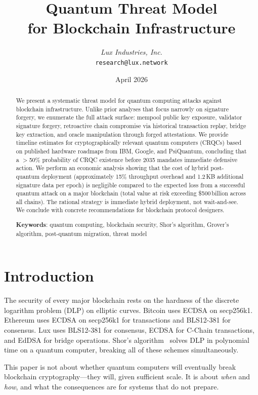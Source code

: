\documentclass[11pt,a4paper]{article}
\title{\textbf{Quantum Threat Model\\for Blockchain Infrastructure}}
\author{
\textit{Lux Industries, Inc.}\\
\texttt{research@lux.network}
}
\date{April 2026}
\begin{document}
\luxcoverpage

\begin{abstract}
We present a systematic threat model for quantum computing attacks against blockchain
infrastructure. Unlike prior analyses that focus narrowly on signature forgery, we
enumerate the full attack surface: mempool public key exposure, validator signature
forgery, retroactive chain compromise via historical transaction replay, bridge key
extraction, and oracle manipulation through forged attestations. We provide timeline
estimates for cryptographically relevant quantum computers (CRQCs) based on published
hardware roadmaps from IBM, Google, and PsiQuantum, concluding that a $>$50\%
probability of CRQC existence before 2035 mandates immediate defensive action.
We perform an economic analysis showing that the cost of hybrid post-quantum deployment
(approximately 15\% throughput overhead and 1.2\,KB additional signature data per epoch)
is negligible compared to the expected loss from a successful quantum attack on a major
blockchain (total value at risk exceeding \$500\,billion across all chains). The
rational strategy is immediate hybrid deployment, not wait-and-see. We conclude with
concrete recommendations for blockchain protocol designers.

\textbf{Keywords}: quantum computing, blockchain security, Shor's algorithm,
Grover's algorithm, post-quantum migration, threat model
\end{abstract}

\tableofcontents
\newpage

\section{Introduction}
\label{sec:introduction}

The security of every major blockchain rests on the hardness of the discrete logarithm
problem (DLP) on elliptic curves. Bitcoin uses ECDSA on secp256k1. Ethereum uses
ECDSA on secp256k1 for transactions and BLS12-381 for consensus. Lux uses BLS12-381
for consensus, ECDSA for C-Chain transactions, and EdDSA for bridge operations.
Shor's algorithm~\cite{shor1997} solves DLP in polynomial time on a quantum computer,
breaking all of these schemes simultaneously.

This paper is not about whether quantum computers will eventually break blockchain
cryptography---they will, given sufficient scale. It is about \emph{when} and
\emph{how}, and what the consequences are for systems that do not prepare.
\end{document}
